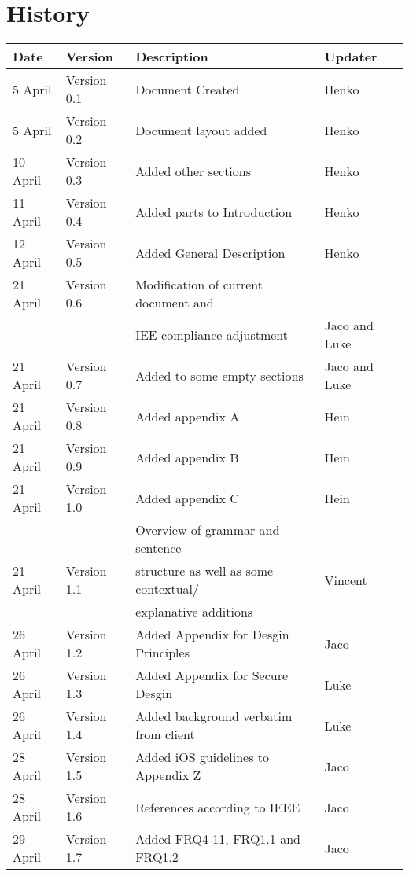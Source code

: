 
\section{History}

\begin{center}

\begin{tabular}{|l|l|l|l|}

\hline
\textbf{Date} & \textbf{Version} & \textbf{Description}&\textbf{Updater}\\ 
\hline
5 April& Version 0.1 & Document Created&Henko\\ 
\hline
5 April& Version 0.2 & Document layout added&Henko\\ 
\hline
10 April & Version 0.3 & Added other sections&Henko\\ 
\hline
11 April & Version 0.4 & Added parts to Introduction&Henko\\ 
\hline
12 April & Version 0.5 & Added General Description&Henko\\ 
\hline
21 April & Version 0.6 & Modification of current document and&\\
&& IEE compliance adjustment&Jaco and Luke\\ 
\hline
21 April & Version 0.7 & Added to some empty sections &Jaco and Luke\\ 
\hline
21 April & Version 0.8 & Added appendix A&Hein\\ 
\hline
21 April & Version 0.9 & Added appendix B&Hein\\ 
\hline
21 April & Version 1.0 & Added appendix C&Hein\\ 
\hline
			&& Overview of grammar and sentence&\\ 
21 April & Version 1.1& structure as well as some contextual/&Vincent\\
			&&explanative additions & \\
\hline
26 April & Version 1.2 & Added Appendix for Desgin Principles& Jaco\\
\hline
26 April & Version 1.3 & Added Appendix for Secure Desgin& Luke\\
\hline
26 April & Version 1.4 & Added background verbatim from client& Luke\\
\hline
28 April & Version 1.5 & Added iOS guidelines to Appendix Z& Jaco\\
\hline
28 April & Version 1.6 & References according to IEEE& Jaco\\
\hline
29 April & Version 1.7 & Added FRQ4-11, FRQ1.1 and FRQ1.2& Jaco\\

\end{tabular}
\end{center}

